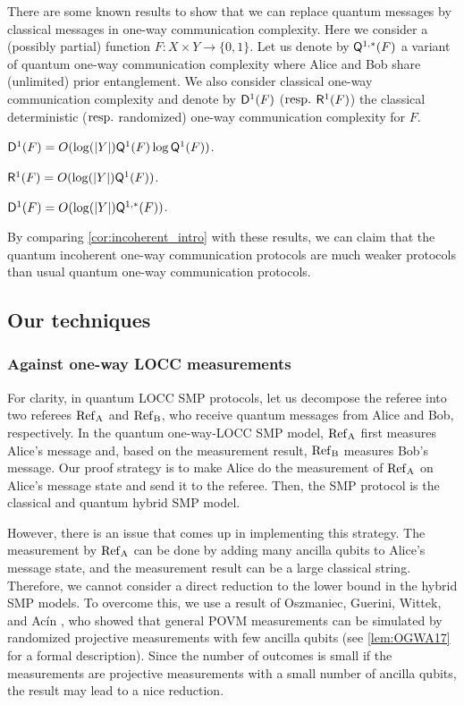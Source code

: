 There are some known results to show that we can replace quantum messages by classical messages in one-way communication complexity. Here we consider a (possibly partial) function $F : X \times Y \rightarrow \{0,1\}$. Let us denote by $\mathsf{Q}^{1,*}(F)$ a variant of quantum one-way communication complexity where Alice and Bob share (unlimited) prior entanglement. We also consider classical one-way communication complexity and denote by $\mathsf{D}^1(F)$ (${\rm resp.}$ $\mathsf{R}^1(F)$) the classical deterministic (${\rm resp.}$ randomized) one-way communication complexity for $F$.

\begin{theorem}
    $\mathsf{D}^1(F) = O(\log (|Y|) \mathsf{Q}^1(F) \log \mathsf{Q}^1(F) )$.
\end{theorem}

\begin{theorem}
    $\mathsf{R}^1(F) = O( \log (|Y|) \mathsf{Q}^1(F))$.
\end{theorem}

\begin{theorem}
    $\mathsf{D}^1(F) = O( \log (|Y|) \mathsf{Q}^{1,*}(F))$.
\end{theorem}

By comparing \cref{cor:incoherent_intro} with these results, we can claim that the quantum incoherent one-way communication protocols are much weaker protocols than usual quantum one-way communication protocols.

\subsection{Our techniques}

\subsubsection*{Against one-way LOCC measurements}

For clarity, in quantum LOCC SMP protocols, let us decompose the referee into two referees $\rm{Ref}_A$ and $\rm{Ref}_B$, who receive quantum messages from Alice and Bob, respectively.
In the quantum one-way-LOCC SMP model, $\rm{Ref}_A$ first measures Alice's message and, based on the measurement result, $\rm{Ref}_B$ measures Bob's message. Our proof strategy is to make Alice do the measurement of $\rm{Ref}_A$ on Alice's message state and send it to the referee. Then, the SMP protocol is the classical and quantum hybrid SMP model.

However, there is an issue that comes up in implementing this strategy. The measurement by $\rm{Ref}_A$ can be done by adding many ancilla qubits to Alice's message state, and the measurement result can be a large classical string. Therefore, we cannot consider a direct reduction to the lower bound in the hybrid SMP models. To overcome this, we use a result of Oszmaniec, Guerini, Wittek, and Ac{\'i}n \cite{OGWA17}, who showed that general POVM measurements can be simulated by randomized projective measurements with few ancilla qubits (see \cref{lem:OGWA17} for a formal description). Since the number of outcomes is small if the measurements are projective measurements with a small number of ancilla qubits, the result may lead to a nice reduction.

